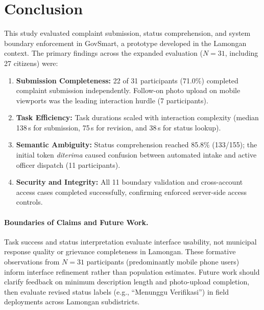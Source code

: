 \documentclass[11pt, runningheads, a4paper]{llncs}
\renewcommand{\st}[1]{\textit{#1}}
\newcommand{\rev}[1]{#1}
\begin{document}
\section{Conclusion}
This study evaluated complaint submission, status comprehension, and system
boundary enforcement in GovSmart, a prototype developed in the Lamongan context.
\rev{The primary findings across the expanded evaluation (\mbox{$N=31$}, including 27 citizens) were:}
\begin{enumerate}
\setlength{\itemsep}{1pt}\setlength{\parskip}{0pt}
\item \rev{\textbf{Submission Completeness:} 22 of 31 participants (71.0\%) completed complaint submission independently. Follow-on photo upload on mobile viewports was the leading interaction hurdle (7 participants).}
\item \rev{\textbf{Task Efficiency:} Task durations scaled with interaction complexity (median 138\,s for submission, 75\,s for revision, and 38\,s for status lookup).}
\item \rev{\textbf{Semantic Ambiguity:} Status comprehension reached 85.8\% (133/155); the initial token \st{diterima} caused confusion between automated intake and active officer dispatch (11 participants).}
\item \textbf{Security and Integrity:} All 11 boundary validation and cross-account access cases completed successfully, confirming enforced server-side access controls.
\end{enumerate}

\paragraph{Boundaries of Claims and Future Work.}
\rev{Task success and status interpretation evaluate interface usability, not municipal response quality or grievance completeness in Lamongan. These formative observations from \mbox{$N=31$} participants (predominantly mobile phone users) inform interface refinement rather than population estimates. Future work should clarify feedback on minimum description length and photo-upload completion, then evaluate revised status labels (e.g., ``Menunggu Verifikasi'') in field deployments across Lamongan subdistricts.}

\end{document}
